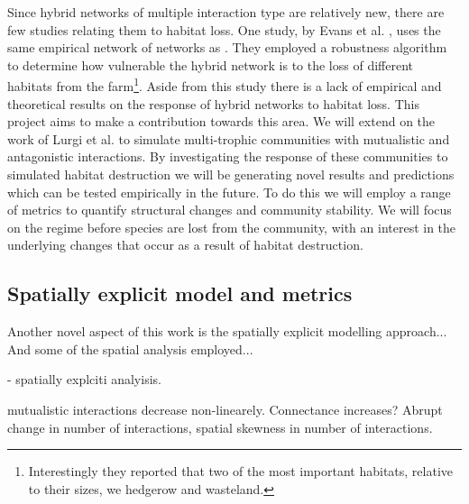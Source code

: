 Since hybrid networks of multiple interaction type are relatively new, there are few studies relating them to habitat loss. One study, by Evans et al. \cite{evans2013robustness}, uses the same empirical network of networks as \cite{pocock2012robustness}. They employed a robustness algorithm to determine how vulnerable the hybrid network is to the loss of different habitats from the farm\footnote{Interestingly they reported that two of the most important habitats, relative to their sizes, we hedgerow and wasteland.}. Aside from this study there is a lack of empirical and theoretical results on the response of hybrid networks to habitat loss. This project aims to make a contribution towards this area. We will extend on the work of Lurgi et al. \cite{lurgi2015effects} to simulate multi-trophic communities with mutualistic and antagonistic interactions. By investigating the response of these communities to simulated habitat destruction we will be generating novel results and predictions which can be tested empirically in the future. To do this we will employ a range of metrics to quantify structural changes and community stability. We will focus on the regime before species are lost from the community, with an interest in the underlying changes that occur as a result of habitat destruction.





\subsection{Spatially explicit model and metrics}

Another novel aspect of this work is the spatially explicit modelling approach...
And some of the spatial analysis employed...

\cite{sole2006ecological}   - spatially explciti analyisis.

\cite{fortuna2013habitat} mutualistic interactions decrease non-linearely. Connectance increases? Abrupt change in number of interactions, spatial skewness in number of interactions.

